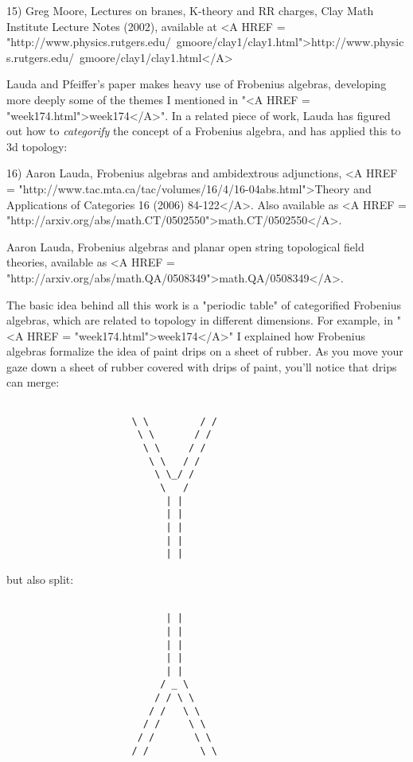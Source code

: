 15) Greg Moore, Lectures on branes, K-theory and RR charges,
Clay Math Institute Lecture Notes (2002), available at
<A HREF = "http://www.physics.rutgers.edu/~gmoore/clay1/clay1.html">http://www.physics.rutgers.edu/~gmoore/clay1/clay1.html</A>

Lauda and Pfeiffer's paper makes heavy use of Frobenius algebras,
developing more deeply some of the themes I mentioned in "<A HREF
= "week174.html">week174</A>".  In a related piece of work, Lauda
has figured out how to \emph{categorify} the concept of a Frobenius
algebra, and has applied this to 3d topology:

16) Aaron Lauda, Frobenius algebras and ambidextrous adjunctions,
<A HREF = "http://www.tac.mta.ca/tac/volumes/16/4/16-04abs.html">Theory 
and Applications of Categories 16 (2006) 84-122</A>.  Also available as 
<A HREF = "http://arxiv.org/abs/math.CT/0502550">math.CT/0502550</A>.


Aaron Lauda, Frobenius algebras and planar open string topological field 
theories, available as
<A HREF = "http://arxiv.org/abs/math.QA/0508349">math.QA/0508349</A>.

The basic idea behind all this work is a "periodic table" of
categorified Frobenius algebras, which are related to topology in
different dimensions.  For example, in "<A HREF =
"week174.html">week174</A>" I explained how Frobenius algebras
formalize the idea of paint drips on a sheet of rubber.  As you move
your gaze down a sheet of rubber covered with drips of paint, you'll
notice that drips can merge:
 

\begin{verbatim}

                      \ \         / /  
                       \ \       / /
                        \ \     / /
                         \ \   / /
                          \ \_/ /      
                           \   /                                        
                            | |
                            | |
                            | |
                            | |
                            | |   

\end{verbatim}
    
but also split:


\begin{verbatim}

                            | |
                            | |   
                            | |
                            | |
                            | |
                           / _ \                                            
                          / / \ \      
                         / /   \ \
                        / /     \ \
                       / /       \ \
                      / /         \ \ 
\end{verbatim}
    
